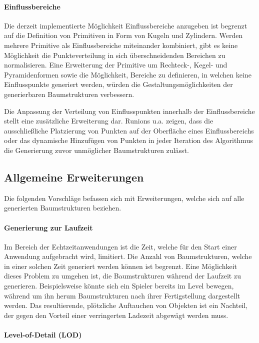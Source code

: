 \paragraph{Einflussbereiche} 

Die derzeit implementierte Möglichkeit Einflussbereiche anzugeben ist begrenzt auf die Definition von Primitiven in Form von Kugeln und Zylindern. Werden mehrere Primitive als Einflussbereiche miteinander kombiniert, gibt es keine Möglichkeit die Punkteverteilung in sich überschneidenden Bereichen zu normalisieren. Eine Erweiterung der Primitive um Rechteck-, Kegel- und Pyramidenformen sowie die Möglichkeit, Bereiche zu definieren, in welchen keine Einflusspunkte generiert werden, würden die Gestaltungsmöglichkeiten der generierbaren Baumstrukturen verbessern. 

Die Anpassung der Verteilung von Einflusspunkten innerhalb der Einflussbereiche stellt eine zusätzliche Erweiterung dar. Runions u.a. zeigen, dass die ausschließliche Platzierung von Punkten auf der Oberfläche eines Einflussbereichs oder das dynamische Hinzufügen von Punkten in jeder Iteration des Algorithmus die Generierung zuvor unmöglicher Baumstrukturen zulässt. \cite[S.5f]{ABOP:04}

\subsection{Allgemeine Erweiterungen}

Die folgenden Vorschläge befassen sich mit Erweiterungen, welche sich auf alle generierten Baumstrukturen beziehen.

\paragraph{Generierung zur Laufzeit}

Im Bereich der Echtzeitanwendungen ist die Zeit, welche für den Start einer Anwendung aufgebracht wird, limitiert. Die Anzahl von Baumstrukturen, welche in einer solchen Zeit generiert werden können ist begrenzt. Eine Möglichkeit dieses Problem zu umgehen ist, die Baumstrukturen während der Laufzeit zu generieren. Beispielsweise könnte sich ein Spieler bereits im Level bewegen, während um ihn herum Baumstrukturen nach ihrer Fertigstellung dargestellt werden. Das resultierende, plötzliche Auftauchen von Objekten ist ein Nachteil, der gegen den Vorteil einer verringerten Ladezeit abgewägt werden muss.

\paragraph{Level-of-Detail (LOD)}

